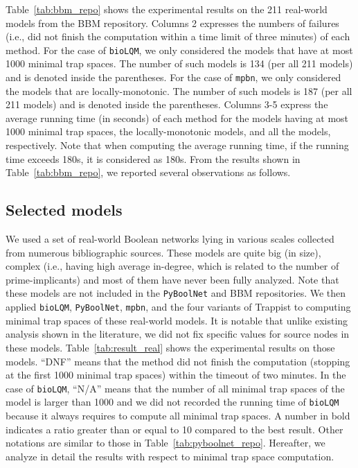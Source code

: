\documentclass[preprint,12pt]{elsarticle}
\begin{document}
Table~\ref{tab:bbm_repo} shows the experimental results on the 211 real-world models from the BBM repository.
Columns 2 expresses the numbers of failures (i.e., did not finish the computation within a time limit of three minutes) of each method.
For the case of \texttt{bioLQM}, we only considered the models that have at most 1000 minimal trap spaces.
The number of such models is 134 (per all 211 models) and is denoted inside the parentheses.
For the case of \texttt{mpbn}, we only considered the models that are locally-monotonic.
The number of such models is 187 (per all 211 models) and is denoted inside the parentheses.
Columns 3-5 express the average running time (in seconds) of each method for the models having at most 1000 minimal trap spaces, the locally-monotonic models, and all the models, respectively.
Note that when computing the average running time, if the running time exceeds 180s, it is considered as 180s.
From the results shown in Table~\ref{tab:bbm_repo}, we reported several observations as follows.


\subsection{Selected models}

We used a set of real-world Boolean networks lying in various scales collected from numerous bibliographic sources.
These models are quite big (in size), complex (i.e., having high average in-degree, which is related to the number of prime-implicants) and most of them have never been fully analyzed.
Note that these models are not included in the \texttt{PyBoolNet} and BBM repositories.
We then applied \texttt{bioLQM}, \texttt{PyBoolNet}, \texttt{mpbn}, and the four variants of Trappist to computing minimal trap spaces of these real-world models.
It is notable that unlike existing analysis shown in the literature, we did not fix specific values for source nodes in these models.
Table~\ref{tab:result_real} shows the experimental results on those models. 
``DNF'' means that the method did not finish the computation (stopping at the first 1000 minimal trap spaces) within the timeout of two minutes.
In the case of \texttt{bioLQM}, ``N/A'' means that the number of all minimal trap spaces of the model is larger than 1000 and we did not recorded the running time of \texttt{bioLQM} because it always requires to compute all minimal trap spaces.
A number in bold indicates a ratio greater than or equal to 10 compared to the best result.
Other notations are similar to those in Table~\ref{tab:pyboolnet_repo}.
Hereafter, we analyze in detail the results with respect to minimal trap space computation.
    
\end{document}
